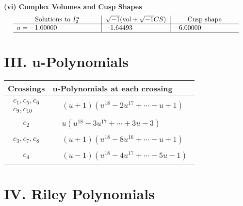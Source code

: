 \documentclass[1p]{elsarticle_modified}
\theoremstyle{definition}
\newcommand{\I}{\sqrt{-1}}
\begin{document}
\newpage\flushleft \textbf{(vi) Complex Volumes and Cusp Shapes}
$$\begin{array}{c|c|c}  
\text{Solutions to }I^u_{2}& \I (\text{vol} + \sqrt{-1}CS) & \text{Cusp shape}\\
 \hline 
\begin{aligned}
u &= -1.00000\phantom{ +0.000000I}\end{aligned}
 & -1.64493\phantom{ +0.000000I} & -6.00000\phantom{ +0.000000I}\\
 \hline 
 \end{array}$$\newpage
\newpage\renewcommand{\arraystretch}{1}
\centering \section*{ III. u-Polynomials}
\begin{tabular}{m{50pt}|m{274pt}}
Crossings & \hspace{64pt}u-Polynomials at each crossing \\
\hline $$\begin{aligned}c_{1},c_{5},c_{6}\\c_{9},c_{10}\end{aligned}$$&$\begin{aligned}
&(u+1)(u^{18}-2 u^{17}+\cdots- u+1)
\end{aligned}$\\
\hline $$\begin{aligned}c_{2}\end{aligned}$$&$\begin{aligned}
&u(u^{18}-3 u^{17}+\cdots+3 u-3)
\end{aligned}$\\
\hline $$\begin{aligned}c_{3},c_{7},c_{8}\end{aligned}$$&$\begin{aligned}
&(u+1)(u^{18}-8 u^{16}+\cdots- u+1)
\end{aligned}$\\
\hline $$\begin{aligned}c_{4}\end{aligned}$$&$\begin{aligned}
&(u-1)(u^{18}-4 u^{17}+\cdots-5 u-1)
\end{aligned}$\\
\hline
\end{tabular}\newpage\renewcommand{\arraystretch}{1}
\centering \section*{ IV. Riley Polynomials}
\end{document}
